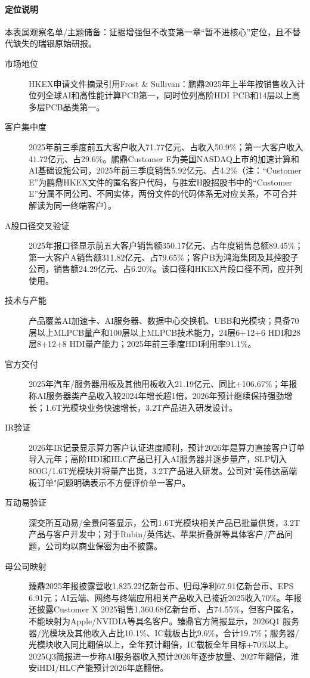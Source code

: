 \begin{exhibitbox}[图表5-12：鹏鼎控股HKEX文件客户与技术证据]
\footnotesize
\paragraph{定位说明} 本表属观察名单/主题储备：证据增强但不改变第一章``暂不进核心''定位，且不替代缺失的瑞银原始研报。
\begin{description}
  \item[市场地位] HKEX申请文件摘录引用Frost \& Sullivan：鹏鼎2025年上半年按销售收入计位列全球AI和高性能计算PCB第一，同时位列高阶HDI PCB和14层以上高多层PCB品类第一。
  \item[客户集中度] 2025年前三季度前五大客户收入71.77亿元、占收入50.9\%；第一大客户收入41.72亿元、占29.6\%。鹏鼎Customer E为美国NASDAQ上市的加速计算和AI基础设施公司，2025年前三季度销售5.92亿元、占4.2\%（注：``Customer E''为鹏鼎HKEX文件的匿名客户代码，与胜宏H股招股书中的``Customer E''分属不同公司、不同实体，两份文件的代码体系无对应关系，不可合并解读为同一终端客户）。
  \item[A股口径交叉验证] 2025年报口径显示前五大客户销售额350.17亿元、占年度销售总额89.45\%；第一大客户A销售额311.82亿元、占79.65\%；客户B为鸿海集团及其控股子公司，销售额24.29亿元、占6.20\%。该口径和HKEX片段口径不同，应并列使用。
  \item[技术与产能] 产品覆盖AI加速卡、AI服务器、数据中心交换机、UBB和光模块；具备70层以上MLPCB量产和100层以上MLPCB技术能力，24层6+12+6 HDI和28层8+12+8 HDI量产能力；2025年前三季度HDI利用率91.1\%。
  \item[官方交付] 2025年汽车/服务器用板及其他用板收入21.19亿元、同比+106.67\%；年报称AI服务器类产品收入较2024年增长超1倍，2026年预计继续保持强劲增长；1.6T光模块业务快速增长，3.2T产品进入研发设计。
  \item[IR验证] 2026年IR记录显示算力客户认证进度顺利，预计2026年是算力直接客户订单导入元年；高阶HDI和HLC产品已打入AI服务器并逐步量产，SLP切入800G/1.6T光模块并将量产出货，3.2T产品进入研发。公司对"英伟达高端板订单"问题明确表示不方便评价单一客户。
  \item[互动易验证] 深交所互动易/全景问答显示，公司1.6T光模块相关产品已批量供货，3.2T产品与客户开发中；对于Rubin/英伟达、苹果折叠屏等具体客户/产品问题，公司均以商业保密为由不披露。
  \item[母公司映射] 臻鼎2025年报披露营收1,825.22亿新台币、归母净利67.91亿新台币、EPS 6.91元；AI云端、网络与终端应用相关产品收入已接近2025收入70\%。年报还披露Customer X 2025销售1,360.68亿新台币、占74.55\%，但客户匿名，不能映射为Apple/NVIDIA等具名客户。臻鼎官方简报显示，2026Q1 服务器/光模块及其他收入占比10.1\%、IC载板占比9.6\%，合计19.7\%；服务器/光模块收入同比翻倍以上，全年预计翻倍，IC载板全年目标+70\%以上。2025Q3简报进一步称AI服务器收入预计2026年逐步放量、2027年翻倍，淮安iHDI/HLC产能预计2026年底翻倍。

\end{description}
\end{exhibitbox}
